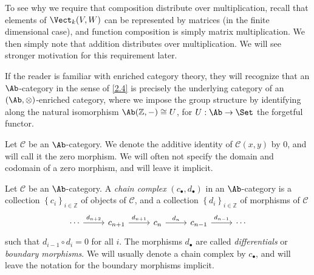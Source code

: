 To see why we require that composition distribute over multiplication, recall that elements of $\Vect_{k} (V,W)$ can be represented by matrices (in the finite dimensional case), and function composition is simply matrix multiplication. We then simply note that addition distributes over multiplication. We will see stronger motivation for this requirement later.

\begin{remark}\label{2.5}
	If the reader is familiar with enriched category theory, they will recognize that an $\Ab $-category in the sense of \cref{2.4} is precisely the underlying category of an $(\Ab ,\otimes )$-enriched category, where we impose the group structure by identifying along the natural isomorphism $\Ab (\mathbb{Z} ,-)\cong U$, for $U : \Ab  \to \Set $ the forgetful functor.
\end{remark}

\begin{notation}\label{2.6}
	Let $\mathcal{C} $ be an $\Ab $-category. We denote the additive identity of $\mathcal{C} (x,y)$ by $0$, and will call it the zero morphism. We will often not specify the domain and codomain of a zero morphism, and will leave it implicit.
\end{notation}

\begin{definition}\label{2.7}
Let $\mathcal{C} $ be an $\Ab $-category. A \emph{chain complex} $(c_{\bullet} ,d_{\bullet} )$ in an $\Ab $-category is a collection $\left\{ c_i \right\}_{i\in\mathbb{Z} } $ of objects of $\mathcal{C} $, and a collection $\left\{ d_i \right\}_{i\in\mathbb{Z} }$ of morphisms of $\mathcal{C} $
\[\begin{tikzcd}[row sep = 2.5em, column sep = 2.5em]
\cdots \ar[" d_{n+2}  ", r]  & c_{n+1} \ar[" d_{n+1}  ", r]  & c_n\ar[" d_n ", r]  & c_{n-1} \ar[" d_{n-1}  ", r]  & \cdots
\end{tikzcd}\]
such that $d_{i-1} \circ d_i=0$ for all $i$. The morphisms $d_{\bullet} $ are called \emph{differentials} or \emph{boundary morphisms}. We will usually denote a chain complex by $c_{\bullet} $, and will leave the notation for the boundary morphisms implicit.
\end{definition}

